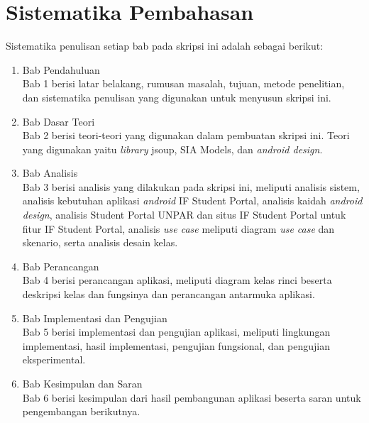 \section{Sistematika Pembahasan}
\label{sec:sispem}
Sistematika penulisan setiap bab pada skripsi ini adalah sebagai berikut:

\begin{enumerate}
  \item Bab Pendahuluan \\
  Bab 1 berisi latar belakang, rumusan masalah, tujuan, metode penelitian,
  dan sistematika penulisan yang digunakan untuk menyusun skripsi ini.
  \item Bab Dasar Teori \\
  Bab 2 berisi teori-teori yang digunakan dalam pembuatan skripsi ini. Teori
  yang digunakan yaitu \textit{library} jsoup, SIA Models, dan \textit{android design}.
  \item Bab Analisis \\
  Bab 3 berisi analisis yang dilakukan pada skripsi ini, meliputi analisis sistem, analisis kebutuhan aplikasi \textit{android} IF Student Portal, analisis kaidah \textit{android design}, analisis Student Portal UNPAR dan situs IF Student Portal untuk fitur IF Student Portal, analisis \textit{use case} meliputi diagram \textsl{use case} dan skenario, serta analisis desain kelas. 
  \item Bab Perancangan \\
  Bab 4 berisi perancangan aplikasi, meliputi diagram kelas rinci beserta deskripsi kelas dan fungsinya dan perancangan antarmuka aplikasi.   
  \item Bab Implementasi dan Pengujian \\
  Bab 5 berisi implementasi dan pengujian aplikasi, meliputi lingkungan implementasi, hasil implementasi, pengujian fungsional, dan pengujian eksperimental.
  \item Bab Kesimpulan dan Saran \\
  Bab 6 berisi kesimpulan dari hasil pembangunan aplikasi beserta saran untuk pengembangan berikutnya.
\end{enumerate}
